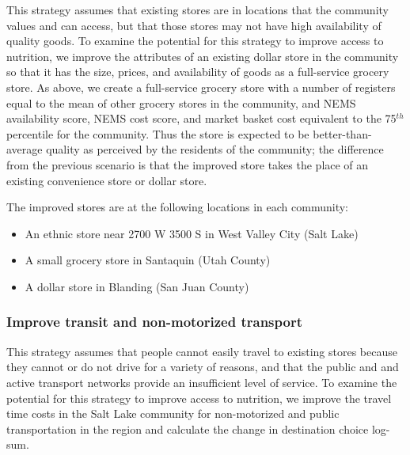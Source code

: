 \documentclass[
  letterpaper,
  authoryear,
  review,
  3p]{elsarticle}
\providecommand{\tightlist}{%
  \setlength{\itemsep}{0pt}\setlength{\parskip}{0pt}}\usepackage{longtable,booktabs,array}
\begin{document}
This strategy assumes that existing stores are in locations that the
community values and can access, but that those stores may not have high
availability of quality goods. To examine the potential for this
strategy to improve access to nutrition, we improve the attributes of an
existing dollar store in the community so that it has the size, prices,
and availability of goods as a full-service grocery store. As above, we
create a full-service grocery store with a number of registers equal to
the mean of other grocery stores in the community, and NEMS availability
score, NEMS cost score, and market basket cost equivalent to the
75\(^{th}\) percentile for the community. Thus the store is expected to
be better-than-average quality as perceived by the residents of the
community; the difference from the previous scenario is that the
improved store takes the place of an existing convenience store or
dollar store.

The improved stores are at the following locations in each community:

\begin{itemize}
\tightlist
\item
  An ethnic store near 2700 W 3500 S in West Valley City (Salt Lake)
\item
  A small grocery store in Santaquin (Utah County)
\item
  A dollar store in Blanding (San Juan County)
\end{itemize}

\hypertarget{improve-transit-and-non-motorized-transport}{%
\subsubsection{Improve transit and non-motorized
transport}\label{improve-transit-and-non-motorized-transport}}

This strategy assumes that people cannot easily travel to existing
stores because they cannot or do not drive for a variety of reasons, and
that the public and and active transport networks provide an
insufficient level of service. To examine the potential for this
strategy to improve access to nutrition, we improve the travel time
costs in the Salt Lake community for non-motorized and public
transportation in the region and calculate the change in destination
choice log-sum.
\end{document}
